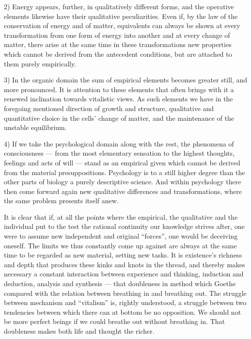 \documentclass[12pt,a4paper]{article}
\begin{document}
2) Energy appears, further, in qualitatively different forms, and the operative
elements likewise have their qualitative peculiarities. Even if, by the law of
the conservation of energy and of matter, equivalents can always be shown at
every transformation from one form of energy into another and at every change of
matter, there arise at the same time in these transformations new properties
which cannot be derived from the antecedent conditions, but are attached to them
purely empirically.

3) In the organic domain the sum of empirical elements becomes greater still,
and more pronounced. It is attention to these elements that often brings with it
a renewed inclination towards vitalistic views. As such elements we have in the
foregoing mentioned direction of growth and structure, qualitative and
quantitative choice in the cells' change of matter, and the maintenance of the
unstable equilibrium.

4) If we take the psychological domain along with the rest, the phenomena of
consciousness ---
from the most elementary sensation to the highest thoughts, feelings and acts of
will --- stand as an empirical given which cannot be derived from the material
presuppositions. Psychology is to a still higher degree than the other parts of
biology a purely descriptive science. And within psychology there then come
forward again new qualitative differences and transformations, where the same
problem presents itself anew.

It is clear that if, at all the points where the empirical, the qualitative and
the individual put to the test the rational continuity our knowledge strives
after, one were to assume new independent and original ``forces'', one would be
deceiving oneself. The limits we thus constantly come up against are always at
the same time to be regarded as new material, setting new tasks. It is
existence's richness and depth that produces these kinks and knots in the
thread, and thereby makes necessary a constant interaction between experience
and thinking, induction and deduction, analysis and synthesis --- that doubleness
in method which Goethe compared with the relation between breathing in and
breathing out. The struggle between mechanism and ``vitalism'' is, rightly
understood, a struggle between two tendencies between which there can at bottom
be no opposition. We should not be more perfect beings if we could breathe out
without breathing in. That doubleness makes both life and thought the richer.
\end{document}

